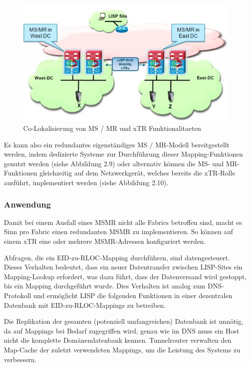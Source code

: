 \begin{figure}[H]
	\centering
	\includegraphics[width=0.8\linewidth]{img/Absicherung/LISP-Example2}
	\caption{Co-Lokalisierung von MS / MR und xTR Funktionalitaeten \cite{LISP-mobility} }
	\label{fig:Co-Lokalisierung von MS / MR und xTR Funktionalitaeten}
\end{figure}

Es kann also ein redundantes eigenständiges MS / MR-Modell bereitgestellt werden, indem dedizierte Systeme zur Durchführung dieser Mapping-Funktionen genutzt werden (siehe Abbildung 2.9) oder alternativ können die MS- und MR-Funktionen gleichzeitig auf dem Netzwerkgerät, welches bereits die xTR-Rolle ausführt, implementiert werden (siehe Abbildung 2.10).

\subsubsection{Anwendung}
Damit bei einem Ausfall eines MSMR nicht alle Fabrics betroffen sind, macht es Sinn pro Fabric einen redundanten MSMR zu implementieren. So können auf einem xTR eine oder mehrere MSMR-Adressen konfiguriert werden.

Abfragen, die ein EID-zu-RLOC-Mapping durchführen, sind datengesteuert. Dieses Verhalten bedeutet, dass ein neuer Datentransfer zwischen LISP-Sites ein Mapping-Lookup erfordert, was dazu führt, dass der Datenversand wird gestoppt, bis ein Mapping durchgeführt wurde. Dies Verhalten ist analog zum DNS-Protokoll und ermöglicht LISP die folgenden Funktionen in einer dezentralen Datenbank mit EID-zu-RLOC-Mappings zu betreiben. 

Die Replikation der gesamten (potenziell umfangreichen) Datenbank ist unnötig, da auf Mappings bei Bedarf zugegriffen wird, genau wie im DNS muss ein Host nicht die komplette Domänendatenbank kennen. Tunnelrouter verwalten den Map-Cache der zuletzt verwendeten Mappings, um die Leistung des Systems zu verbessern.

